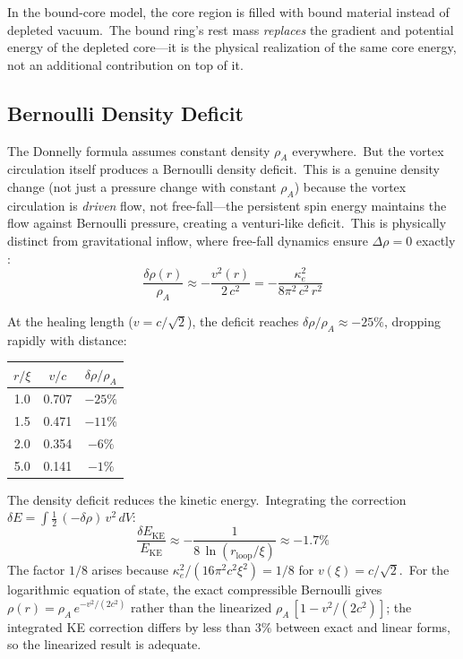 \documentclass[12pt,letterpaper]{article}
\newcommand{\rhoa}{\rho_{\!A}}
\newcommand{\rloop}{r_{\mathrm{loop}}}
\begin{document}
In the bound-core model, the core region is filled with bound material
instead of depleted vacuum.\ The bound ring's rest mass \emph{replaces} the
gradient and potential energy of the depleted core---it is the physical
realization of the same core energy, not an additional contribution on top
of it.

\subsection{Bernoulli Density Deficit}
\label{sec:bernoulli-density}

The Donnelly formula assumes constant density $\rhoa$ everywhere.\ But the
vortex circulation itself produces a Bernoulli density deficit.\ This is a
genuine density change (not just a pressure change with constant $\rhoa$)
because the vortex circulation is \emph{driven} flow, not free-fall---the
persistent spin energy maintains the flow against Bernoulli pressure,
creating a venturi-like deficit.\ This is physically distinct from
gravitational inflow, where free-fall dynamics ensure $\Delta\rho = 0$
exactly \cite{otto-relativity}:
%
\begin{equation}
  \frac{\delta\rho(r)}{\rhoa} \approx -\frac{v^2(r)}{2\,c^2}
  = -\frac{\kappa_e^2}{8\pi^2\,c^2\,r^2}
  \label{eq:density-deficit}
\end{equation}

At the healing length ($v = c/\sqrt{2}$), the deficit reaches
$\delta\rho/\rhoa \approx -25\%$, dropping rapidly with distance:

\begin{center}
\begin{tabular}{@{}ccc@{}}
\toprule
$r/\xi$ & $v/c$ & $\delta\rho/\rhoa$ \\
\midrule
1.0 & 0.707 & $-25\%$ \\
1.5 & 0.471 & $-11\%$ \\
2.0 & 0.354 & $-6\%$ \\
5.0 & 0.141 & $-1\%$ \\
\bottomrule
\end{tabular}
\end{center}

The density deficit reduces the kinetic energy.\ Integrating the correction
$\delta E = \int\!\tfrac{1}{2}\,(-\delta\rho)\,v^2\,dV$:
%
\begin{equation}
  \frac{\delta E_{\mathrm{KE}}}{E_{\mathrm{KE}}} \approx
  -\frac{1}{8\,\ln(\rloop/\xi)}
  \approx -1.7\%
  \label{eq:ke-correction}
\end{equation}
%
The factor $1/8$ arises because $\kappa_e^2/(16\pi^2 c^2 \xi^2) = 1/8$ for
$v(\xi) = c/\sqrt{2}$.\ For the logarithmic equation of state, the exact
compressible Bernoulli gives $\rho(r) = \rhoa\,e^{-v^2/(2c^2)}$ rather than
the linearized $\rhoa\,[1 - v^2/(2c^2)]$; the integrated KE correction
differs by less than $3\%$ between exact and linear forms, so the linearized
result is adequate.
\end{document}
